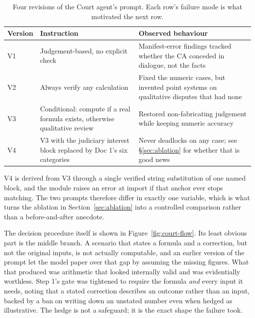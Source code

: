 \begin{table}[htbp]
\centering
\footnotesize
\setlength{\tabcolsep}{4pt}
\renewcommand{\arraystretch}{1.25}
\caption[Court prompt revisions]{Four revisions of the Court agent's prompt. Each
row's failure mode is what motivated the next row.}
\label{tab:court-versions}
\begin{tabular}{|p{1.4cm}|p{3.6cm}|p{5.4cm}|}
\hline
\textbf{Version} & \textbf{Instruction} & \textbf{Observed behaviour} \\
\hline
V1 & Judgement-based, no explicit check &
 Manifest-error findings tracked whether the CA conceded in dialogue, not the
 facts \\
\hline
V2 & Always verify any calculation &
 Fixed the numeric cases, but invented point systems on qualitative disputes
 that had none \\
\hline
V3 & Conditional: compute if a real formula exists, otherwise qualitative
 review &
 Restored non-fabricating judgement while keeping numeric accuracy \\
\hline
V4 & V3 with the judiciary interest block replaced by Doc 1's six categories &
 Never deadlocks on any case; see \S\ref{sec:ablation} for whether that is
 good news \\
\hline
\end{tabular}
\end{table}

V4 is derived from V3 through a single verified string substitution of one named
block, and the module raises an error at import if that anchor ever stops
matching. The two prompts therefore differ in exactly one variable, which is what
turns the ablation in Section~\ref{sec:ablation} into a controlled comparison
rather than a before-and-after anecdote.

The decision procedure itself is shown in Figure~\ref{fig:court-flow}. Its
least obvious part is the middle branch. A scenario that states a formula and a
correction, but not the original inputs, is not actually computable, and an
earlier version of the prompt let the model paper over that gap by assuming the
missing figures. What that produced was arithmetic that looked internally valid
and was evidentially worthless. Step 1's gate was tightened to require the
formula \emph{and} every input it needs, noting that a stated correction describes
an outcome rather than an input, backed by a ban on writing down an unstated
number even when hedged as illustrative. The hedge is not a safeguard; it is the
exact shape the failure took.

